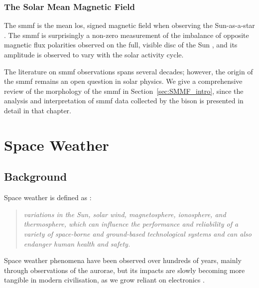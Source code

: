 \glsresetall 
{}
\subsubsection*{The Solar Mean Magnetic Field}

The \gls{smmf} is the mean \gls{los}, signed magnetic field when observing the Sun-as-a-star \citep{scherrer_mean_1977, scherrer_mean_1977-1, garcia_integrated_1999}. The \gls{smmf} is surprisingly a non-zero measurement of the imbalance of opposite magnetic flux polarities observed on the full, visible disc of the Sun \citep{svalgaard_suns_1975}, and its amplitude is observed to vary with the solar activity cycle.

The literature on \gls{smmf} observations spans several decades; however, the origin of the \gls{smmf} remains an open question in solar physics. We give a comprehensive review of the morphology of the \gls{smmf} in Section~\ref{sec:SMMF_intro}, since the analysis and interpretation of \gls{smmf} data collected by the \gls{bison} is presented in detail in that chapter.




\glsresetall 
{}
\section{Space Weather}\label{sec:intro_SW}

\subsection{Background}
Space weather is defined as \citep{cannon_extreme_2013}:

\begin{quote}
	\textit{variations in the Sun, solar wind, magnetosphere, ionosphere, and thermosphere, which can influence the performance and reliability of a variety of space-borne and ground-based technological systems and can also endanger human health and safety.}
\end{quote}

Space weather phenomena have been observed over hundreds of years, mainly through observations of the aurorae, but its impacts are slowly becoming more tangible in modern civilisation, as we grow reliant on electronics \citep{beggan_ground_2018}. 

